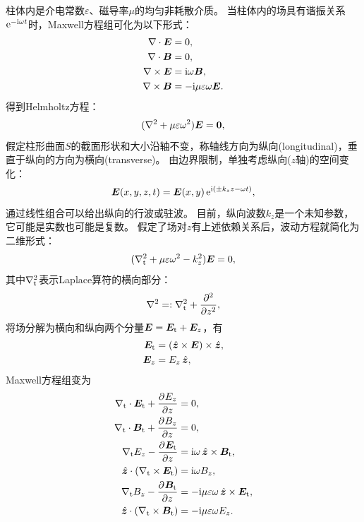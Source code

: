 柱体内是介电常数$\varepsilon$、磁导率$\mu$的均匀非耗散介质。
当柱体内的场具有谐振关系$\e^{-\i\omega t}$时，Maxwell方程组可化为以下形式：
\begin{subequations}
    \begin{align}
        \div\bm E &= 0,\\
        \div\bm B &= 0,\\
        \curl\bm E &= \i\omega\bm B,\\
        \curl\bm B &= -\i\mu\varepsilon\omega\bm E.
    \end{align}
\end{subequations}
得到Helmholtz方程：
\[
    (\laplacian + \mu\varepsilon\omega^2)\bm E = \bm 0,
\]
假定柱形曲面$S$的截面形状和大小沿轴不变，称轴线方向为纵向(longitudinal)，垂直于纵向的方向为横向(transverse)。
由边界限制，单独考虑纵向($z$轴)的空间变化：
\[
    \bm E(x,y,z,t) = \bm E(x,y)\e^{\i(\pm k_zz-\omega t)},
\]
通过线性组合可以给出纵向的行波或驻波。
目前，纵向波数$k_z$是一个未知参数，它可能是实数也可能是复数。
假定了场对$z$有上述依赖关系后，波动方程就简化为二维形式：
\begin{equation}
    \label{eqn:lapla_tE}
    (\laplacian_\transv + \mu\varepsilon\omega^2 - k_z^2)\bm E = 0,
\end{equation}
其中$\laplacian_\transv$表示Laplace算符的横向部分：
\[
    \laplacian =: \laplacian_\transv + \pp[2]z,
\]
将场分解为横向和纵向两个分量$\bm E = \bm E_\transv + \bm E_z$，有
\begin{subequations}
    \begin{align}
        \bm E_\transv &= (\uvec z \times \bm E) \times \uvec z,\\
        \bm E_z &= E_z\uvec z,
    \end{align}
\end{subequations}
Maxwell方程组变为
\begin{subequations}
    \label{eqn:EtEzBtBz}
    \begin{align}
        \nabla_\transv \cdot \bm E_\transv + \pv{E_z}z &= 0,\\
        \nabla_\transv \cdot \bm B_\transv + \pv{B_z}z &= 0,\\
        \nabla_\transv E_z - \pv{\bm E_\transv}z &= \i\omega\uvec z \times \bm B_\transv,\\
        \uvec z \cdot (\nabla_\transv \times \bm E_\transv) &= \i\omega B_z,\\
        \nabla_\transv B_z - \pv{\bm B_\transv}z &= -\i\mu\varepsilon\omega\uvec z \times \bm E_\transv,\\
        \uvec z \cdot (\nabla_\transv \times \bm B_\transv) &= -\i\mu\varepsilon\omega E_z.
    \end{align}
\end{subequations}
